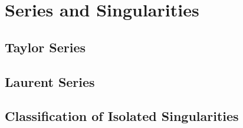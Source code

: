 \section{Series and Singularities}

\subsection{Taylor Series}

\subsection{Laurent Series}

\subsection{Classification of Isolated Singularities}